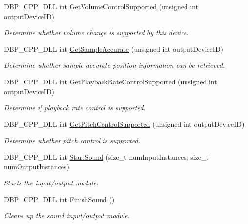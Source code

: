 \begin{DoxyCompactItemize}
DBP\_\-CPP\_\-DLL int \hyperlink{namespacemn_sound_a2efcdd9f3ed0e6806606a63b43a723b4}{GetVolumeControlSupported} (unsigned int outputDeviceID)
\begin{DoxyCompactList}\small\item\em Determine whether volume change is supported by this device. \item\end{DoxyCompactList}\item 
DBP\_\-CPP\_\-DLL int \hyperlink{namespacemn_sound_ab5a3cb8258f43c727338aef5ebd11f02}{GetSampleAccurate} (unsigned int outputDeviceID)
\begin{DoxyCompactList}\small\item\em Determine whether sample accurate position information can be retrieved. \item\end{DoxyCompactList}\item 
DBP\_\-CPP\_\-DLL int \hyperlink{namespacemn_sound_a3a038d4d7819d4fce909a46e0df90088}{GetPlaybackRateControlSupported} (unsigned int outputDeviceID)
\begin{DoxyCompactList}\small\item\em Determine if playback rate control is supported. \item\end{DoxyCompactList}\item 
DBP\_\-CPP\_\-DLL int \hyperlink{namespacemn_sound_af993040e427438184c7038d6b72929c5}{GetPitchControlSupported} (unsigned int outputDeviceID)
\begin{DoxyCompactList}\small\item\em Determine whether pitch control is supported. \item\end{DoxyCompactList}\item 
DBP\_\-CPP\_\-DLL int \hyperlink{namespacemn_sound_aca60b744a68a7f44ef38232112c992e4}{StartSound} (size\_\-t numInputInstances, size\_\-t numOutputInstances)
\begin{DoxyCompactList}\small\item\em Starts the input/output module. \item\end{DoxyCompactList}\item 
DBP\_\-CPP\_\-DLL int \hyperlink{namespacemn_sound_ac9b7c27495dddb81c37a40840ab201b3}{FinishSound} ()
\begin{DoxyCompactList}\small\item\em Cleans up the sound input/output module. \item\end{DoxyCompactList}\item 

\end{DoxyCompactItemize}
